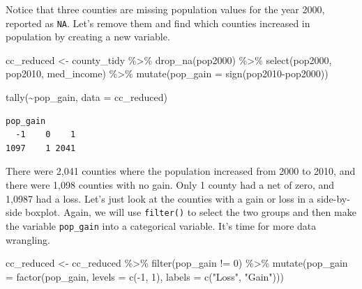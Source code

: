 \documentclass[
  letterpaper,
  DIV=11,
  numbers=noendperiod]{scrreprt}
\newenvironment{Shaded}{\begin{snugshade}}{\end{snugshade}}
\newcommand{\AttributeTok}[1]{\textcolor[rgb]{0.40,0.45,0.13}{#1}}
\newcommand{\DecValTok}[1]{\textcolor[rgb]{0.68,0.00,0.00}{#1}}
\newcommand{\FunctionTok}[1]{\textcolor[rgb]{0.28,0.35,0.67}{#1}}
\newcommand{\NormalTok}[1]{\textcolor[rgb]{0.00,0.23,0.31}{#1}}
\newcommand{\OtherTok}[1]{\textcolor[rgb]{0.00,0.23,0.31}{#1}}
\newcommand{\SpecialCharTok}[1]{\textcolor[rgb]{0.37,0.37,0.37}{#1}}
\newcommand{\StringTok}[1]{\textcolor[rgb]{0.13,0.47,0.30}{#1}}
\begin{document}
Notice that three counties are missing population values for the year
2000, reported as \texttt{NA}. Let's remove them and find which counties
increased in population by creating a new variable.

\begin{Shaded}
\begin{Highlighting}[]
\NormalTok{cc\_reduced }\OtherTok{\textless{}{-}}\NormalTok{ county\_tidy }\SpecialCharTok{\%\textgreater{}\%}
  \FunctionTok{drop\_na}\NormalTok{(pop2000) }\SpecialCharTok{\%\textgreater{}\%}
  \FunctionTok{select}\NormalTok{(pop2000, pop2010, med\_income) }\SpecialCharTok{\%\textgreater{}\%}
  \FunctionTok{mutate}\NormalTok{(}\AttributeTok{pop\_gain =} \FunctionTok{sign}\NormalTok{(pop2010}\SpecialCharTok{{-}}\NormalTok{pop2000))}
\end{Highlighting}
\end{Shaded}

\begin{Shaded}
\begin{Highlighting}[]
\FunctionTok{tally}\NormalTok{(}\SpecialCharTok{\textasciitilde{}}\NormalTok{pop\_gain, }\AttributeTok{data =}\NormalTok{ cc\_reduced)}
\end{Highlighting}
\end{Shaded}

\begin{verbatim}
pop_gain
  -1    0    1 
1097    1 2041 
\end{verbatim}

There were 2,041 counties where the population increased from 2000 to
2010, and there were 1,098 counties with no gain. Only 1 county had a
net of zero, and 1,0987 had a loss. Let's just look at the counties with
a gain or loss in a side-by-side boxplot. Again, we will use
\texttt{filter()} to select the two groups and then make the variable
\texttt{pop\_gain} into a categorical variable. It's time for more data
wrangling.

\begin{Shaded}
\begin{Highlighting}[]
\NormalTok{cc\_reduced }\OtherTok{\textless{}{-}}\NormalTok{ cc\_reduced }\SpecialCharTok{\%\textgreater{}\%}
  \FunctionTok{filter}\NormalTok{(pop\_gain }\SpecialCharTok{!=} \DecValTok{0}\NormalTok{) }\SpecialCharTok{\%\textgreater{}\%}
  \FunctionTok{mutate}\NormalTok{(}\AttributeTok{pop\_gain =} \FunctionTok{factor}\NormalTok{(pop\_gain, }\AttributeTok{levels =} \FunctionTok{c}\NormalTok{(}\SpecialCharTok{{-}}\DecValTok{1}\NormalTok{, }\DecValTok{1}\NormalTok{), }
                           \AttributeTok{labels =} \FunctionTok{c}\NormalTok{(}\StringTok{"Loss"}\NormalTok{, }\StringTok{"Gain"}\NormalTok{)))}
\end{Highlighting}
\end{Shaded}
\end{document}
